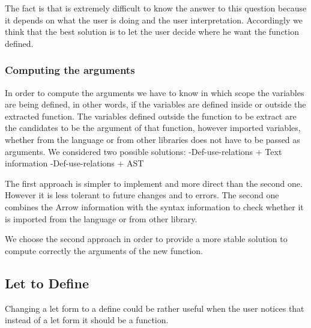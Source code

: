The fact is that is extremely difficult to know the answer to this question because
it depends on what the user is doing and the user interpretation.
Accordingly we think that the best solution is to let the user decide where
he want the function defined.


\subsubsection{Computing the arguments}

In order to compute the arguments we have to know in which scope the variables are being defined, in other words,
if the variables are defined inside or outside the extracted function.%
The variables defined outside the function to be extract are the candidates to be the argument %
of that function, however imported variables, whether from the language or from other libraries
does not have to be passed as arguments.
We considered two possible solutions:
  -Def-use-relations + Text information
  -Def-use-relations + AST

The first approach is simpler to implement and more direct than the second one.
However it is less tolerant to future changes and to errors.
The second one combines the Arrow information with the syntax information to
check whether it is imported from the language or from other library.

We choose the second approach in order to provide a more stable solution to compute
 correctly the arguments of the new function.

\subsection{Let to Define} %
Changing a let form to a define could be rather useful when the user
notices that instead of a let form it should be a function. %

